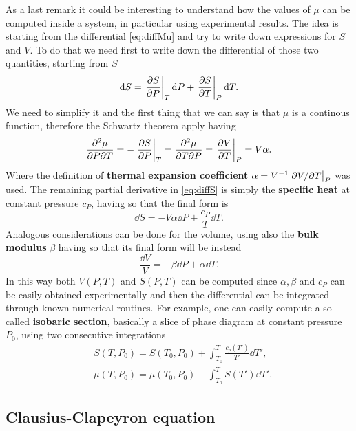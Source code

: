 As a last remark it could be interesting to understand how the values of $\mu$ can be computed inside a system, in particular using experimental results. The idea is starting from the differential \eqref{eq:diffMu} and try to write down expressions for $S$ and $V$. To do that we need first to write down the differential of those two quantities, starting from $S$
\begin{equation}
    \label{eq:diffS}
    \dd S = \eval{\pdv{S}{P}}_T\dd P + \eval{\pdv{S}{T}}_P\dd T.
\end{equation}
We need to simplify it and the first thing that we can say is that $\mu$ is a continous function, therefore the Schwartz theorem apply having
\begin{equation}
    \pdv{\mu}{P}{T} = -\eval{\pdv{S}{P}}_{T} = \pdv{\mu}{T}{P} = \eval{\pdv{V}{T}}_P = V\alpha.
\end{equation}
Where the definition of \textbf{thermal expansion coefficient} $\alpha = V^{-1}\eval{\partial V/\partial T}_P$ was used. The remaining partial derivative in \eqref{eq:diffS} is simply the \textbf{specific heat} at constant pressure $c_P$, having so that the final form is
\begin{equation}
    \dd S = -V\alpha\dd P + \frac{c_P}{T}\dd T.
\end{equation}
Analogous considerations can be done for the volume, using also the \textbf{bulk modulus} $\beta$ having so that its final form will be instead
\begin{equation}
    \frac{\dd V}{V} = -\beta\dd P + \alpha\dd T.
\end{equation}
In this way both $V(P, T)$ and $S(P, T)$ can be computed since $\alpha, \beta$ and $c_P$ can be easily obtained experimentally and then the differential can be integrated through known numerical routines. For example, one can easily compute a so-called \textbf{isobaric section}, basically a slice of phase diagram at constant pressure $P_0$, using two consecutive integrations
\begin{align}
    &S(T, P_0) = S(T_0, P_0) + \int_{T_0}^T\frac{c_p(T')}{T'} \dd T',\\
    &\mu(T, P_0) = \mu(T_0, P_0) - \int_{T_0}^T S(T') \dd T'.
\end{align}

\subsection{Clausius-Clapeyron equation}

